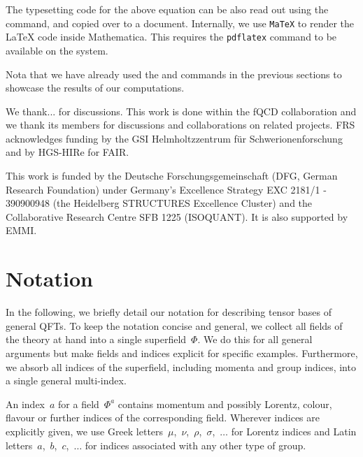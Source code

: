 \documentclass[10pt,prd,nofootinbib,superscriptaddress,twocolumn]{revtex4-2}
\newcommand{\mathem}{\mmaInlineCell{Code}}
\newcommand{\bash}{\lstinline[language=Bash]}
\begin{document}
The typesetting code for the above equation can be also read out using the \mathem{\mmaDef{FTex}} command, and copied over to a document. Internally, we use \texttt{MaTeX} \cite{szabolcs_horvat_2024_10828124} to render the \LaTeX\xspace code inside Mathematica. This requires the \bash{pdflatex} command to be available on the system.

Nota that we have already used the \mathem{\mmaDef{FPrint}} and \mathem{\mmaDef{FPlot}} commands in the previous sections to showcase the results of our computations.

\begin{acknowledgments}
We thank... for discussions. This work is done within the fQCD collaboration \cite{fQCD} and we thank its members for discussions and collaborations on related projects.
FRS acknowledges funding by the GSI Helmholtzzentrum f\"ur Schwerionenforschung and by HGS-HIRe for FAIR.

This work is funded by the Deutsche Forschungsgemeinschaft (DFG, German Research Foundation) under Germany’s Excellence Strategy EXC 2181/1 - 390900948 (the Heidelberg STRUCTURES Excellence Cluster) and the Collaborative Research Centre SFB 1225 (ISOQUANT). It is also supported by EMMI. 
	
	
\end{acknowledgments}

\appendix


\section{Notation}
\label{app:notation}

In the following, we briefly detail our notation for describing tensor bases of general QFTs.
To keep the notation concise and general, we collect all fields of the theory at hand into a single superfield~$\Phi$. 
We do this for all general arguments but make fields and indices explicit for specific examples.
Furthermore, we absorb all indices of the superfield, including momenta and group indices, into a single general multi-index.

An index~$a$ for a field~$\Phi^a$ contains momentum and possibly Lorentz, colour, flavour or further indices of the corresponding field.
Wherever indices are explicitly given, we use Greek letters~$\mu$,~$\nu$,~$\rho$,~$\sigma$,~$\dotsc$ for Lorentz indices and Latin letters~$a$,~$b$,~$c$,~$\dotsc$ for indices associated with any other type of group. 
\end{document}
